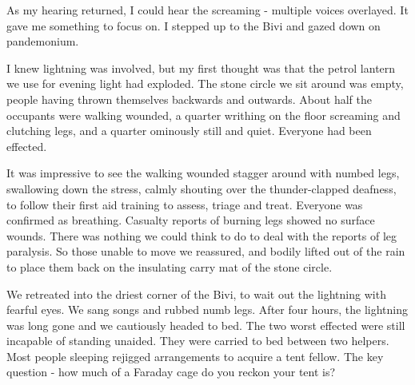 As my hearing returned, I could hear the screaming - multiple voices overlayed. It gave me something to focus on. I stepped up to the Bivi and gazed down on pandemonium. 

I knew lightning was involved, but my first thought was that the petrol lantern we use for evening light had exploded. The stone circle we sit around was empty, people having thrown themselves backwards and outwards. About half the occupants were walking wounded, a quarter writhing on the floor screaming and clutching legs, and a quarter ominously still and quiet. Everyone had been effected.

It was impressive to see the walking wounded stagger around with numbed legs, swallowing down the stress, calmly shouting over the thunder-clapped deafness, to follow their first aid training to assess, triage and treat. Everyone was confirmed as breathing. Casualty reports of burning legs showed no surface wounds. There was nothing we could think to do to deal with the reports of leg paralysis. So those unable to move we reassured, and bodily lifted out of the rain to place them back on the insulating carry mat of the stone circle. 


We retreated into the driest corner of the Bivi, to wait out the lightning with fearful eyes. We sang songs and rubbed numb legs. After four hours, the lightning was long gone and we cautiously headed to bed. The two worst effected were still incapable of standing unaided. They were carried to bed between two helpers. Most people sleeping rejigged arrangements to acquire a tent fellow. The key question - how much of a Faraday cage do you reckon your tent is?

